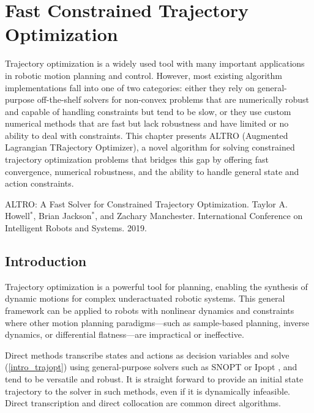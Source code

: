 \chapter{Fast Constrained Trajectory Optimization}

Trajectory optimization is a widely used tool with many important applications in robotic motion planning and control. However, most existing algorithm implementations fall into one of two categories: either they rely on general-purpose off-the-shelf solvers for non-convex problems that are numerically robust and capable of handling constraints but tend to be slow, or they use custom numerical methods that are fast but lack robustness and have limited or no ability to deal with constraints. This chapter presents ALTRO (Augmented Lagrangian TRajectory Optimizer), a novel algorithm for solving constrained trajectory optimization problems that bridges this gap by offering fast convergence, numerical robustness, and the ability to handle general state and action constraints.

\vspace*{\fill}

\noindent ALTRO: A Fast Solver for Constrained Trajectory Optimization. Taylor A. Howell$^*$, Brian Jackson$^*$, and Zachary Manchester. International Conference on Intelligent Robots and Systems. 2019.

\pagebreak

\section{Introduction}
Trajectory optimization is a powerful tool for planning, enabling the synthesis of dynamic motions for complex underactuated robotic systems. This general framework can be applied to robots with nonlinear dynamics and constraints where other motion planning paradigms---such as sample-based planning, inverse dynamics, or differential flatness---are impractical or ineffective.

Direct methods transcribe states and actions as decision variables and solve (\ref{intro_trajopt}) using general-purpose solvers such as SNOPT \cite{gill2005snopt} or Ipopt \cite{wachter2006implementation}, and tend to be versatile and robust. It is straight forward to provide an initial state trajectory to the solver in such methods, even if it is dynamically infeasible. Direct transcription \cite{pardo2016evaluating} and direct collocation \cite{hargraves1987direct} are common direct algorithms. 

